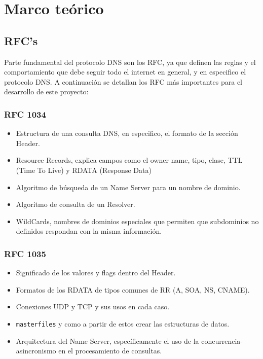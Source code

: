 \chapter{Marco teórico}

\section{RFC's}

Parte fundamental del protocolo DNS son los RFC, ya que definen las reglas y el comportamiento que debe seguir todo el internet
en general, y en especifico el protocolo DNS. A continuación se detallan los RFC más importantes para el desarrollo de 
este proyecto:

\subsection{RFC 1034}

\begin{itemize}
    \item Estructura de una consulta DNS, en especifico, el formato de la sección Header.
    \item Resource Records, explica campos como el owner name, tipo, clase, TTL (Time To Live) y RDATA (Response Data)
    \item Algoritmo de búsqueda de un Name Server para un nombre de dominio.
    \item Algoritmo de consulta de un Resolver.
    \item WildCards, nombres de dominios especiales que permiten que subdominios no definidos respondan con la misma información.
\end{itemize}

\subsection{RFC 1035}

\begin{itemize}
    \item Significado de los valores y flags dentro del Header.
    \item Formatos de los RDATA de tipos comunes de RR (A, SOA, NS, CNAME).
    \item Conexiones UDP y TCP y sus usos en cada caso.
    \item \texttt{masterfiles} y como a partir de estos crear las estructuras de datos.
    \item Arquitectura del Name Server, específicamente el uso de la concurrencia-asincronismo en el procesamiento de consultas.
\end{itemize}


